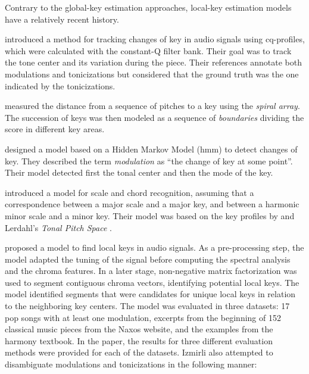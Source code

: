 


Contrary to the global-key estimation approaches, local-key
estimation models have a relatively recent history.

\textcite{purwins2000new} introduced a method for tracking
changes of key in audio signals using cq-profiles, which
were calculated with the constant-Q filter bank. Their goal
was to track the tone center and its variation during the
piece. Their references annotate both modulations and
tonicizations but considered that the ground truth was the
one indicated by the tonicizations.

\textcite{chew2002spiral} measured the distance from a
sequence of pitches to a key using the \emph{spiral array}.
The succession of keys was then modeled as a sequence of
\emph{boundaries} dividing the score in different key areas.

\textcite{chai2005detection} designed a model based on a
Hidden Markov Model (\gls{hmm}) to detect changes of key.
They described the term \emph{modulation} as ``the change of
key at some point''. Their model detected first the tonal
center and then the mode of the key.

\textcite{catteau2007probabilistic} introduced a model for
scale and chord recognition, assuming that a correspondence
between a major scale and a major key, and between a
harmonic minor scale and a minor key. Their model was based
on the key profiles by \textcite{temperley1999whats} and
Lerdahl's \emph{Tonal Pitch Space}
\parencite{lerdahl2005tonal}.

\textcite{izmirli2007localized} proposed a model to find
local keys in audio signals. As a pre-processing step, the
model adapted the tuning of the signal before computing the
spectral analysis and the chroma features. In a later stage,
non-negative matrix factorization was used to segment
contiguous chroma vectors, identifying potential local keys.
The model identified segments that were candidates for
unique local keys in relation to the neighboring key
centers. The model was evaluated in three datasets: 17 pop
songs with at least one modulation, excerpts from the
beginning of 152 classical music pieces from the Naxos
website, and the examples from the
\textcite{kostka1984tonal} harmony textbook. In the paper,
the results for three different evaluation methods were
provided for each of the datasets. Izmirli also attempted to
disambiguate modulations and tonicizations in the following
manner:

